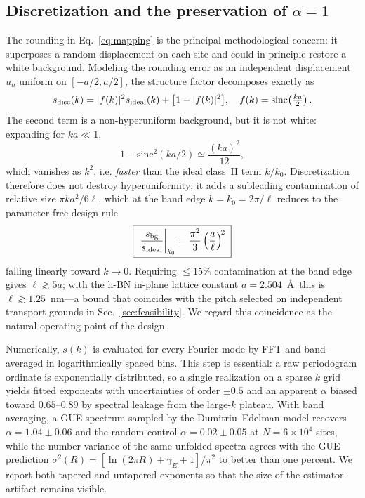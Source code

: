 \documentclass[
  aps,
  prl,
  reprint,
  amsmath,
  amssymb,
  superscriptaddress,
  floatfix,
  nofootinbib
]{revtex4-2}
\newcommand{\kzero}{k_{0}}
\begin{document}
\subsection{Discretization and the preservation of $\alpha=1$}
\label{sec:discretization}

The rounding in Eq.~\eqref{eq:mapping} is the principal methodological
concern: it superposes a random displacement on each site and could in
principle restore a white background. Modeling the rounding error as an
independent displacement $u_n$ uniform on $[-a/2,a/2]$, the structure factor
decomposes exactly as
\begin{equation}
  s_{\rm disc}(k)=|f(k)|^{2}s_{\rm ideal}(k)+\big[1-|f(k)|^{2}\big],
  \quad f(k)=\mathrm{sinc}\!\left(\tfrac{ka}{2}\right).
  \label{eq:decomp}
\end{equation}
The second term is a non-hyperuniform background, but it is not white:
expanding for $ka\ll1$,
\begin{equation}
  1-\mathrm{sinc}^{2}(ka/2)\simeq\frac{(ka)^{2}}{12},
  \label{eq:bgexp}
\end{equation}
which vanishes as $k^{2}$, i.e. \emph{faster} than the ideal class~II term
$k/\kzero$. Discretization therefore does not destroy hyperuniformity; it adds
a subleading contamination of relative size $\pi k a^{2}/6\ell$, which at the
band edge $k=\kzero=2\pi/\ell$ reduces to the parameter-free design rule
\begin{equation}
  \boxed{\;
  \left.\frac{s_{\rm bg}}{s_{\rm ideal}}\right|_{\kzero}
    = \frac{\pi^{2}}{3}\left(\frac{a}{\ell}\right)^{\!2}\;}
  \label{eq:designrule}
\end{equation}
falling linearly toward $k\to0$. Requiring $\le15\%$ contamination at the band
edge gives $\ell\gtrsim5a$; with the h-BN in-plane lattice constant
$a=2.504$~\AA\ this is $\ell\gtrsim1.25$~nm---a bound that coincides with the
pitch selected on independent transport grounds in
Sec.~\ref{sec:feasibility}. We regard this coincidence as the natural
operating point of the design.

Numerically, $s(k)$ is evaluated for every Fourier mode by FFT and
band-averaged in logarithmically spaced bins. This step is essential: a raw
periodogram ordinate is exponentially distributed, so a single realization on
a sparse $k$ grid yields fitted exponents with uncertainties of order $\pm0.5$
and an apparent $\alpha$ biased toward $0.65$--$0.89$ by spectral leakage from
the large-$k$ plateau. With band averaging, a GUE spectrum sampled by the
Dumitriu--Edelman model recovers $\alpha=1.04\pm0.06$ and the random control
$\alpha=0.02\pm0.05$ at $N=6\times10^{4}$ sites, while the number variance of
the same unfolded spectra agrees with the GUE prediction
$\sigma^{2}(R)=[\ln(2\pi R)+\gamma_E+1]/\pi^{2}$ to better than one percent.
We report both tapered and untapered exponents so that the size of the
estimator artifact remains visible.
\end{document}

